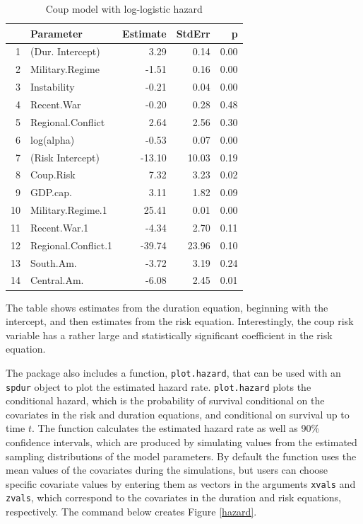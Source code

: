 \documentclass[]{article}
\begin{document}
\begin{table}[ht]
\centering
\caption{Coup model with log-logistic hazard} \label{loglog_table}
\begin{tabular}{rlrrr}
  \hline
 & Parameter & Estimate & StdErr & p \\ 
  \hline
1 & (Dur. Intercept) & 3.29 & 0.14 & 0.00 \\ 
  2 & Military.Regime & -1.51 & 0.16 & 0.00 \\ 
  3 & Instability & -0.21 & 0.04 & 0.00 \\ 
  4 & Recent.War & -0.20 & 0.28 & 0.48 \\ 
  5 & Regional.Conflict & 2.64 & 2.56 & 0.30 \\ 
  6 & log(alpha) & -0.53 & 0.07 & 0.00 \\ 
  7 & (Risk Intercept) & -13.10 & 10.03 & 0.19 \\ 
  8 & Coup.Risk & 7.32 & 3.23 & 0.02 \\ 
  9 & GDP.cap. & 3.11 & 1.82 & 0.09 \\ 
  10 & Military.Regime.1 & 25.41 & 0.01 & 0.00 \\ 
  11 & Recent.War.1 & -4.34 & 2.70 & 0.11 \\ 
  12 & Regional.Conflict.1 & -39.74 & 23.96 & 0.10 \\ 
  13 & South.Am. & -3.72 & 3.19 & 0.24 \\ 
  14 & Central.Am. & -6.08 & 2.45 & 0.01 \\ 
   \hline
\end{tabular}
\end{table}

\normalsize
The table shows estimates from the duration equation, beginning with the
intercept, and then estimates from the risk equation. Interestingly, the
coup risk variable has a rather large and statistically significant
coefficient in the risk equation.

The package also includes a function, \texttt{plot.hazard}, that can be
used with an \texttt{spdur} object to plot the estimated hazard rate.
\texttt{plot.hazard} plots the conditional hazard, which is the
probability of survival conditional on the covariates in the risk and
duration equations, and conditional on survival up to time \(t\). The
function calculates the estimated hazard rate as well as 90\% confidence
intervals, which are produced by simulating values from the estimated
sampling distributions of the model parameters. By default the function
uses the mean values of the covariates during the simulations, but users
can choose specific covariate values by entering them as vectors in the
arguments \texttt{xvals} and \texttt{zvals}, which correspond to the
covariates in the duration and risk equations, respectively. The command
below creates Figure \ref{hazard}.
\end{document}
